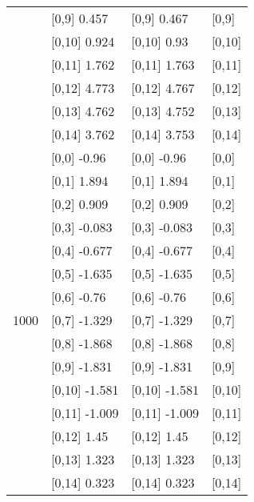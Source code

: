 \begin{table}
\begin{tabular}[t]{llll}
 & {}[0,9] 0.457 & {}[0,9] 0.467 & {}[0,9]\\
\addlinespace
 & {}[0,10] 0.924 & {}[0,10] 0.93 & {}[0,10]\\
 & {}[0,11] 1.762 & {}[0,11] 1.763 & {}[0,11]\\
 & {}[0,12] 4.773 & {}[0,12] 4.767 & {}[0,12]\\
 & {}[0,13] 4.762 & {}[0,13] 4.752 & {}[0,13]\\
 & {}[0,14] 3.762 & {}[0,14] 3.753 & {}[0,14]\\
\addlinespace
 & {}[0,0] -0.96 & {}[0,0] -0.96 & {}[0,0]\\
 & {}[0,1] 1.894 & {}[0,1] 1.894 & {}[0,1]\\
 & {}[0,2] 0.909 & {}[0,2] 0.909 & {}[0,2]\\
 & {}[0,3] -0.083 & {}[0,3] -0.083 & {}[0,3]\\
 & {}[0,4] -0.677 & {}[0,4] -0.677 & {}[0,4]\\
\addlinespace
 & {}[0,5] -1.635 & {}[0,5] -1.635 & {}[0,5]\\
 & {}[0,6] -0.76 & {}[0,6] -0.76 & {}[0,6]\\
1000 & {}[0,7] -1.329 & {}[0,7] -1.329 & {}[0,7]\\
 & {}[0,8] -1.868 & {}[0,8] -1.868 & {}[0,8]\\
 & {}[0,9] -1.831 & {}[0,9] -1.831 & {}[0,9]\\
\addlinespace
 & {}[0,10] -1.581 & {}[0,10] -1.581 & {}[0,10]\\
 & {}[0,11] -1.009 & {}[0,11] -1.009 & {}[0,11]\\
 & {}[0,12] 1.45 & {}[0,12] 1.45 & {}[0,12]\\
 & {}[0,13] 1.323 & {}[0,13] 1.323 & {}[0,13]\\
 & {}[0,14] 0.323 & {}[0,14] 0.323 & {}[0,14]\\
\bottomrule
\end{tabular}
\end{table}
